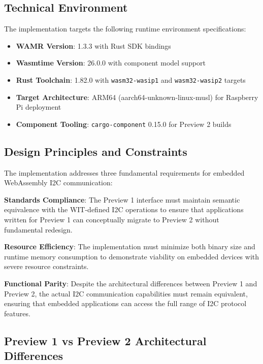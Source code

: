 \subsection{Technical Environment}

The implementation targets the following runtime environment specifications:

\begin{itemize}
    \item \textbf{WAMR Version}: 1.3.3 with Rust SDK bindings
    \item \textbf{Wasmtime Version}: 26.0.0 with component model support
    \item \textbf{Rust Toolchain}: 1.82.0 with \texttt{wasm32-wasip1} and \texttt{wasm32-wasip2} targets
    \item \textbf{Target Architecture}: ARM64 (aarch64-unknown-linux-musl) for Raspberry Pi deployment
    \item \textbf{Component Tooling}: \texttt{cargo-component} 0.15.0 for Preview 2 builds
\end{itemize}

\subsection{Design Principles and Constraints}

The implementation addresses three fundamental requirements for embedded WebAssembly I2C communication:

\textbf{Standards Compliance}: The Preview 1 interface must maintain semantic equivalence with the WIT-defined I2C operations to ensure that applications written for Preview 1 can conceptually migrate to Preview 2 without fundamental redesign.

\textbf{Resource Efficiency}: The implementation must minimize both binary size and runtime memory consumption to demonstrate viability on embedded devices with severe resource constraints.

\textbf{Functional Parity}: Despite the architectural differences between Preview 1 and Preview 2, the actual I2C communication capabilities must remain equivalent, ensuring that embedded applications can access the full range of I2C protocol features.

\subsection{Preview 1 vs Preview 2 Architectural Differences}

